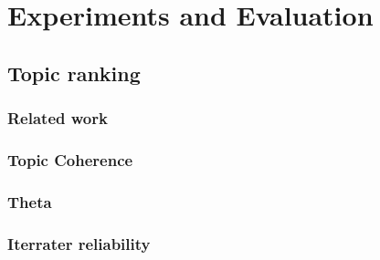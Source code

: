 \chapter{Experiments and Evaluation}
\section{Topic ranking}


\subsection{Related work}

\subsection{Topic Coherence}

\subsection{Theta}
\subsection{Iterrater reliability}



